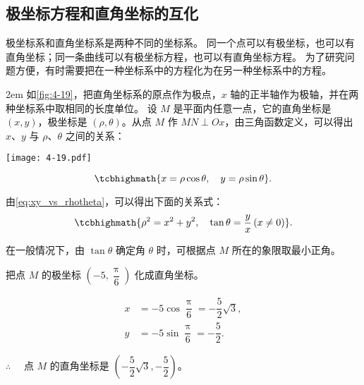 \subsection{极坐标方程和直角坐标的互化}
极坐标系和直角坐标系是两种不同的坐标系。
同一个点可以有极坐标，也可以有直角坐标；同一条曲线可以有极坐标方程，也可以有直角坐标方程。
为了研究问题方便，有时需要把在一种坐标系中的方程化为在另一种坐标系中的方程。

\medskip\noindent
\begin{minipage}{0.65\linewidth}\parindent2em
如\cref{fig:4-19}，把直角坐标系的原点作为极点，$x$ 轴的正半轴作为极轴，并在两种坐标系中取相同的长度单位。
设 $M$ 是平面内任意一点，它的直角坐标是 $(x,y)$，极坐标是 $(\rho,\theta)$。从点 $M$ 作 $MN\perp Ox$，由三角函数定义，可以得出 $x$、$y$ 与 $\rho$、$\theta$ 之间的关系：
\end{minipage}\hfill
\begin{minipage}{0.3\linewidth}
  \begin{figurehere}
    \texttt{[image: 4-19.pdf]}
    \caption{}\label{fig:4-19}
  \end{figurehere}
\end{minipage}

\begin{equation}
  \label{eq:xy_vs_rhotheta}
  \tcbhighmath{x=\rho\cos\theta,\quad y=\rho\sin\theta}.
\end{equation}

由\cref{eq:xy_vs_rhotheta}，可以得出下面的关系式：
\begin{equation}
  \label{eq:rhotheta_vs_xy}
  \tcbhighmath{\rho^2=x^2+y^2,\quad \tan\theta=\frac{y}{x}\,(x\neq 0)}.
\end{equation}

在一般情况下，由 $\tan\theta$ 确定角 $\theta$ 时，可根据点 $M$ 所在的象限取最小正角。

\begin{example}
  把点 $M$ 的极坐标 $\left(-5,\dfrac{\uppi}{6}\right)$ 化成直角坐标。
\end{example}
\begin{solution}
  \begin{align*}
  x&=-5\cos\dfrac{\uppi}{6}=-\dfrac{5}{2}\sqrt{3},\\
  y&=-5\sin\dfrac{\uppi}{6}=-\dfrac{5}{2}.
  \end{align*}
  
  $\therefore\quad$ 点 $M$ 的直角坐标是 $\left(-\dfrac{5}{2}\sqrt{3},-\dfrac{5}{2}\right)$。
\end{solution}

